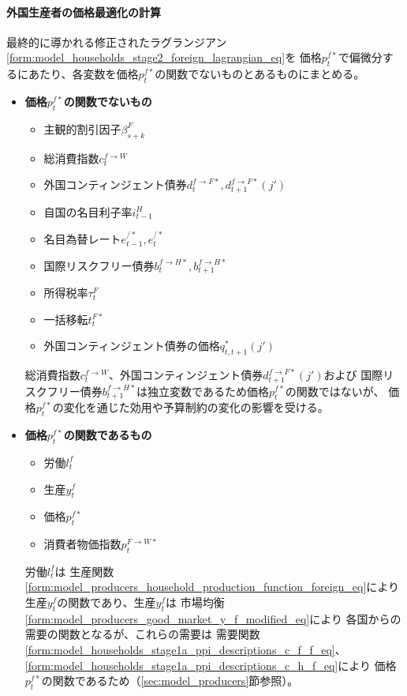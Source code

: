 \paragraph{外国生産者の価格最適化の計算}
\label{sec:chapter3_assumptions_price_optimization_foreign_caliculation}
最終的に導かれる修正されたラグランジアン\eqref{form:model_households_stage2_foreign_lagrangian_eq}を
価格\(p_t^{f*}\)で偏微分するにあたり、各変数を価格\(p_t^{f*}\)の関数でないものとあるものにまとめる。
\begin{itemize}
    \item
    \label{itm:chapter3_assumptions_price_optimization_foreign_caliculation_remark1}
        \textbf{価格\(p_t^{f*}\)の関数でないもの}
        \begin{itemize}
            \item 主観的割引因子\(\beta_{s+k}^F\)
            \item 総消費指数\(c_t^{f\to W}\)
            \item 外国コンティンジェント債券\(d_t^{f\to F*}, d_{t+1}^{f\to F*}(j')\)
            \item 自国の名目利子率\(i_{t-1}^H\)
            \item 名目為替レート\(e_{t-1}^{/*}, e_t^{/*}\)
            \item 国際リスクフリー債券\(b_t^{f\to H*}, b_{t+1}^{f\to H*}\)
            \item 所得税率\(\tau_t^F\)
            \item 一括移転\(t_t^{F*}\)
            \item 外国コンティンジェント債券の価格\(q_{t,t+1}^*(j')\)
        \end{itemize}
        総消費指数\(c_t^{f\to W}\)、外国コンティンジェント債券\(d_{t+1}^{f\to F*}(j')\)および
        国際リスクフリー債券\(b_{t+1}^{f\to H*}\)は独立変数であるため価格\(p_t^{f*}\)の関数ではないが、
        価格\(p_t^{f*}\)の変化を通じた効用や予算制約の変化の影響を受ける。
    \item
    \label{itm:chapter3_assumptions_price_optimization_foreign_caliculation_remark2}
        \textbf{価格\(p_t^{f*}\)の関数であるもの}
        \begin{itemize}
            \item 労働\(l_t^f\)
            \item 生産\(y_t^f\)
            \item 価格\(p_t^{f*}\)
            \item 消費者物価指数\(p_t^{F\to W*}\)
        \end{itemize}
        労働\(l_t^f\)は
        生産関数\eqref{form:model_producers_household_production_function_foreign_eq}により
        生産\(y_t^f\)の関数であり、生産\(y_t^f\)は
        市場均衡\eqref{form:model_producers_good_market_y_f_modified_eq}により
        各国からの需要の関数となるが、これらの需要は
        需要関数
        \eqref{form:model_households_stage1a_ppi_descriptions_c_f_f_eq}、
        \eqref{form:model_households_stage1a_ppi_descriptions_c_h_f_eq}により
        価格\(p_t^{f*}\)の関数であるため（\ref{sec:model_producers}節参照）。
\end{itemize}
